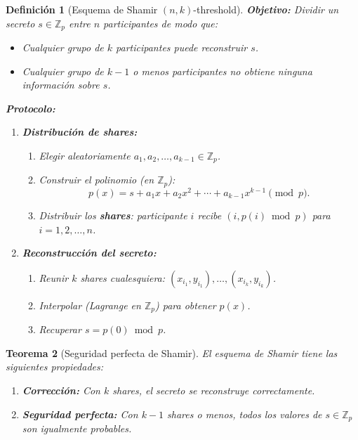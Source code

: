 \documentclass[a4paper,11pt]{report}
\newtheorem{theorem}{Teorema}[chapter]
\newtheorem{definition}[theorem]{Definición}
\begin{document}
\begin{definition}[Esquema de Shamir $(n, k)$-threshold]
\textbf{Objetivo:} Dividir un secreto $s \in \mathbb{Z}_p$ entre $n$ participantes de modo que:
\begin{itemize}
\item Cualquier grupo de $k$ participantes puede reconstruir $s$.
\item Cualquier grupo de $k-1$ o menos participantes no obtiene \textit{ninguna información} sobre $s$.
\end{itemize}

\textbf{Protocolo:}
\begin{enumerate}
\item \textbf{Distribución de shares:}
   \begin{enumerate}
   \item Elegir aleatoriamente $a_1, a_2, \ldots, a_{k-1} \in \mathbb{Z}_p$.
   \item Construir el polinomio (en $\mathbb{Z}_p$):
   \[
   p(x) = s + a_1 x + a_2 x^2 + \cdots + a_{k-1} x^{k-1} \pmod{p}.
   \]
   \item Distribuir los \textbf{shares}: participante $i$ recibe $(i, p(i) \bmod p)$ para $i = 1, 2, \ldots, n$.
   \end{enumerate}

\item \textbf{Reconstrucción del secreto:}
   \begin{enumerate}
   \item Reunir $k$ shares cualesquiera: $(x_{i_1}, y_{i_1}), \ldots, (x_{i_k}, y_{i_k})$.
   \item Interpolar (Lagrange en $\mathbb{Z}_p$) para obtener $p(x)$.
   \item Recuperar $s = p(0) \bmod p$.
   \end{enumerate}
\end{enumerate}
\end{definition}

\begin{theorem}[Seguridad perfecta de Shamir]
El esquema de Shamir tiene las siguientes propiedades:
\begin{enumerate}
\item \textbf{Corrección:} Con $k$ shares, el secreto se reconstruye correctamente.
\item \textbf{Seguridad perfecta:} Con $k-1$ shares o menos, todos los valores de $s \in \mathbb{Z}_p$ son igualmente probables.
\end{enumerate}
\end{theorem}
\end{document}
